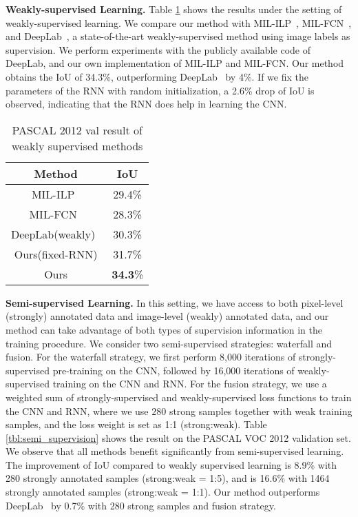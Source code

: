 \documentclass[10pt,twocolumn,letterpaper]{article}
\begin{document}
\textbf{Weakly-supervised Learning.}
Table \ref{tbl:result_semantic_segmentation} shows the results under the setting of weakly-supervised learning. We compare our method with MIL-ILP~\cite{pinheiro2015image}, MIL-FCN~\cite{DBLP:FCnetwork}, and DeepLab~\cite{DBLP:WeaklySegmentation}, a state-of-the-art weakly-supervised method using image labels as supervision. We perform experiments with the publicly available code of DeepLab, and our own implementation of MIL-ILP and MIL-FCN. Our method obtains the IoU of 34.3\%, outperforming DeepLab~\cite{DBLP:WeaklySegmentation} by 4\%. If we fix the parameters of the RNN with random initialization, a 2.6\% drop of IoU is observed, indicating that the RNN does help in learning the CNN. %

\begin{table}[!h]\small
\begin{center}
\begin{tabular}{|c|c|}
\hline
Method & IoU \\
\hline
MIL-ILP~\cite{pinheiro2015image} & 29.4\% \\
\hline
MIL-FCN~\cite{DBLP:FCnetwork} & 28.3\% \\
\hline
DeepLab(weakly)~\cite{DBLP:WeaklySegmentation} & 30.3\% \\
\hline
Ours(fixed-RNN) & 31.7\% \\
\hline
Ours & \textbf{34.3}\% \\
\hline

\end{tabular}
\end{center}
\caption{PASCAL 2012 val result of weakly supervised methods}
\label{tbl:result_semantic_segmentation}
\end{table}


\textbf{Semi-supervised Learning.}
In this setting, we have access to both pixel-level (strongly) annotated data and image-level (weakly) annotated data, and our method can take advantage of both types of supervision information in the training procedure. We consider two semi-supervised strategies: waterfall and fusion. For the waterfall strategy, we first perform 8,000 iterations of strongly-supervised pre-training on the CNN, followed by 16,000 iterations of weakly-supervised training on the CNN and RNN. For the fusion strategy, we use a weighted sum of strongly-supervised and weakly-supervised loss functions to train the CNN and RNN, where we use $280$ strong samples together with weak training samples, and the loss weight is set as 1:1 (strong:weak). Table \ref{tbl:semi_supervision} shows the result on the PASCAL VOC 2012 validation set. We observe that all methods benefit significantly from semi-supervised learning. The improvement of IoU compared to weakly supervised learning is 8.9\% with 280 strongly annotated samples (strong:weak = 1:5), and is 16.6\% with 1464 strongly annotated samples (strong:weak = 1:1). Our method outperforms DeepLab~\cite{DBLP:WeaklySegmentation} by 0.7\% with 280 strong samples and fusion strategy.
\end{document}
